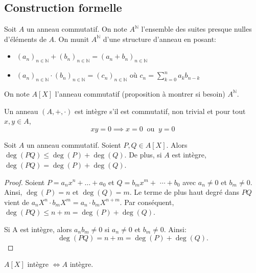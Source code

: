 \subsection{Construction formelle}

\begin{definition}

	Soit $A$ un anneau commutatif. On note $A^{\mathbb{N}}$ l'ensemble des suites presque nulles d'éléments de $A$.
	On munit $A^{\mathbb{N}}$ d'une structure d'anneau en posant:
	\begin{itemize}
		\item $(a_n)_{n \in \mathbb{N}} + (b_n)_{n \in \mathbb{N}} = (a_n + b_n)_{n \in \mathbb{N}}$
		\item $(a_n)_{n \in \mathbb{N}} \cdot (b_n)_{n \in \mathbb{N}} = (c_n)_{n \in \mathbb{N}}$ où $c_n = \sum_{k=0}^{n} a_k b_{n-k}$
	\end{itemize}

	On note $A[X]$ l'anneau commutatif (proposition à montrer si besoin)  $A^{\mathbb{N}}$.

\end{definition}

\begin{definition}
	Un anneau $(A, +, \cdot)$ est intègre s'il est commutatif, non trivial et pour tout $x, y \in A$,
	\begin{equation*}
		xy = 0 \implies x = 0 \ \text{ ou } \ y = 0
	\end{equation*}
\end{definition}

\begin{prop}
	Soit $A$ un anneau commutatif.
	Soient $P, Q \in A[X]$. Alors $\deg(PQ) \leq \deg(P) + \deg(Q)$.
	De plus, si $A$ est intègre, $\deg(PQ) = \deg(P) + \deg(Q)$.
\end{prop}

\begin{proof}
	Soient $P=a_n x^n+\ldots+a_0$ et $Q=b_m x^m+$ $\cdots+b_0$ avec $a_n \neq 0$ et $b_m \neq 0$.
	Ainsi, $\deg(P)=n$ et $\deg(Q)=m$. Le terme de plus haut degré dans $P Q$ vient de $a_n X^n \cdot b_m X^m=a_n \cdot b_m X^{n+m}$.
	Par conséquent, $\deg(P Q) \leq n+m=\deg(P)+\deg(Q)$.

	Si A est intègre, alors $a_n b_m \neq 0$ si $a_n \neq 0$ et $b_m \neq 0$. Ainsi:
	$$
		\deg(P Q)=n+m=\deg(P)+\deg(Q).
	$$
\end{proof}

\begin{coro}
	$A[X]$ intègre $\iff A$ intègre.
\end{coro}

